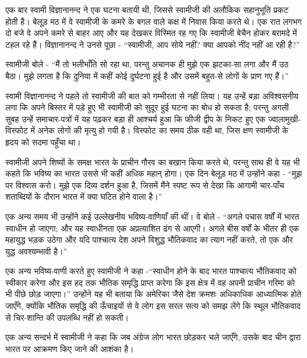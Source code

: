\delimiter

एक बार स्वामी विज्ञानानन्द ने एक घटना बतायी थी, जिससे स्वामीजी की अलौकिक सहानुभूति प्रकट होती है। बेलूड़ मठ में वे स्वामीजी के कमरे के बगल वाले कक्ष में निवास किया करते थे। एक रात लगभग दो बजे वे अपने कमरे से बाहर आए और यह देखकर विस्मित रह गए कि स्वामीजी बेचैन होकर बरामदे में टहल रहे हैं। विज्ञानानन्द ने उनसे पूछा - “स्वामीजी, आप सोये नहीं? क्या आपको नींद नहीं आ रही है?” 

स्वामीजी बोले - “मैं तो भलीभाँति सो रहा था, परन्तु अचानक ही मुझे एक झटका-सा लगा और मैं उठ बैठा। मुझे लगता है कि दुनिया में कहीं कोई दुर्घटना हुई है और उसमें बहुत-से लोगों के प्राण गए हैं।” 

स्वामी विज्ञानानन्द ने पहले तो स्वामीजी की बात को गम्भीरता से नहीं लिया। यह उन्हें बड़ा अविश्वसनीय लगा कि अपने बिस्तर में पड़े हुए भी स्वामीजी को सुदूर हुई घटना का बोध हो सकता है; परन्तु अगली सुबह उन्हें समाचार-पत्रों में यह पढ़कर बड़ा ही आश्चर्य हुआ कि फीजी द्वीप के निकट हुए एक ज्वालामुखी-विस्फोट में अनेक लोगों की मृत्यु हो गयी है। विस्फोट का समय ठीक वही था, जिस क्षण स्वामीजी के हृदय को सदमा पहुँचा था। 

\vskip -5pt

\delimiter

स्वामीजी अपने शिष्यों के समक्ष भारत के प्राचीन गौरव का बखान किया करते थे, परन्तु साथ ही वे यह भी कहते कि भविष्य का भारत उससे भी कहीं अधिक महान् होगा। एक दिन बेलूड़ मठ में उन्होंने कहा - “मुझ पर विश्वास करो। मुझे एक दिव्य दर्शन हुआ है, जिसमें मैंने स्पष्ट रूप से देखा कि आगामी चार-पाँच शताब्दियों के दौरान भारत में क्या घटित होने वाला है।” 

एक अन्य समय भी उन्होंने कई उल्लेखनीय भविष्य-वाणियाँ की थीं। वे बोले - “अगले पचास वर्षों में भारत स्वाधीन हो जाएगा; और यह स्वाधीनता एक अप्रत्याशित ढंग से आएगी। अगले बीस वर्षों के भीतर ही एक महायुद्ध भड़क उठेगा और यदि पाश्चात्य देश अपने विशुद्ध भौतिकवाद का त्याग नहीं करते, तो एक और युद्ध अवश्यम्भावी है।” 

एक अन्य भविष्य-वाणी करते हुए स्वामीजी ने कहा -“स्वाधीन होने के बाद भारत पाश्चात्य भौतिकवाद को स्वीकार करेगा और इस हद तक भौतिक समृद्धि प्राप्त करेगा कि इस क्षेत्र में वह अपनी प्राचीन गरिमा को भी पीछे छोड़ जाएगा।” उन्होंने यह भी बताया कि अमेरिका जैसे देश क्रमशः अधिकाधिक आध्यात्मिक होते जाएँगे, क्योंकि भौतिक समृद्धि की ऊँचाइयों से वे लोग इस सरल सत्य को समझ लेंगे कि स्थूल भौतिकवाद से चिर-शान्ति की उपलब्धि नहीं हो सकती। 

एक अन्य सन्दर्भ में स्वामीजी ने कहा कि जब अंग्रेज लोग भारत छोड़कर चले जाएँगे, उसके बाद चीन द्वारा भारत पर आक्रमण किए जाने की आशंका है। 

